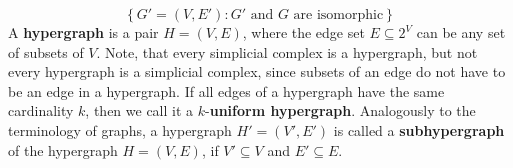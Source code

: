 \[
\left\{G'=(V,E'):G'\text{ and }G\text{ are isomorphic}\right\}
\]
A \textbf{hypergraph} is a pair \(H=(V,E)\), where the edge set \(E\subseteq 2^V\) can be any set of subsets of \(V\). Note, that every simplicial complex is a hypergraph, but not every hypergraph is a simplicial complex, since subsets of an edge do not have to be an edge in a hypergraph. If all edges of a hypergraph have the same cardinality \(k\), then we call it a \(k\)-\textbf{uniform hypergraph}. Analogously to the terminology of graphs, a hypergraph \(H'=(V',E')\) is called a \textbf{subhypergraph} of the hypergraph \(H=(V,E)\), if \(V'\subseteq V\) and \(E'\subseteq E\).

